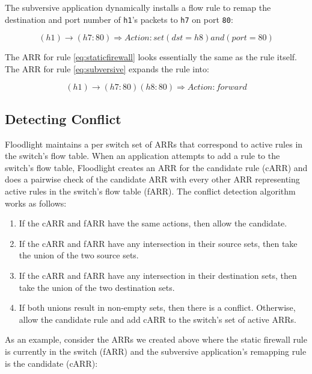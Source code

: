 The subversive application dynamically installs a flow rule to remap the destination and port number of \texttt{h1}'s packets to \texttt{h7} on port \texttt{80}:

\begin{equation}\label{eq:subversive}
(h1) \rightarrow (h7:80) \Rightarrow Action: set (dst = h8) and (port = 80)
\end{equation}

The ARR for rule \ref{eq:staticfirewall} looks essentially the same as the rule itself.
The ARR for rule \ref{eq:subversive} expands the rule into:

\begin{equation}\label{eq:arrsubversive}
(h1) \rightarrow (h7:80) (h8:80) \Rightarrow Action: forward
\end{equation}

\subsection{Detecting Conflict}
\label{subsec:conflict}
Floodlight maintains a per switch set of ARRs that correspond to active rules in the switch's flow table.
When an application attempts to add a rule to the switch's flow table, Floodlight creates an ARR for the candidate rule (cARR) and does a pairwise check of the candidate ARR with every other ARR representing active rules in the switch's flow table (fARR).
The conflict detection algorithm works as follows:
\begin{enumerate}
\item If the cARR and fARR have the same actions, then allow the candidate.
\item If the cARR and fARR have any intersection in their source sets, then take the union of the two source sets.
\item If the cARR and fARR have any intersection in their destination sets, then take the union of the two destination sets.
\item If both unions result in non-empty sets, then there is a conflict. Otherwise, allow the candidate rule and add cARR to the switch's set of active ARRs.
\end{enumerate} 

As an example, consider the ARRs we created above where the static firewall rule is currently in the switch (fARR) and the subversive application's remapping rule is the candidate (cARR):

